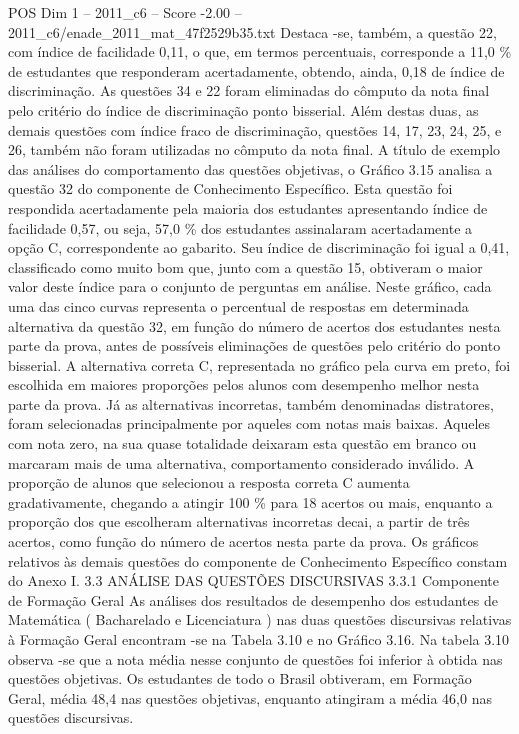 \begin{textsample}{POS Dim 1 – 2011\_c6 – Score -2.00 – 2011\_c6/enade\_2011\_mat\_47f2529b35.txt}
Destaca -se, também, a questão 22, com índice de facilidade 0,11, o que, em termos percentuais, corresponde a 11,0 \% de estudantes que responderam acertadamente, obtendo, ainda, 0,18 de índice de discriminação.
As questões 34 e 22 foram eliminadas do cômputo da nota final pelo critério do índice de discriminação ponto bisserial.
Além destas duas, as demais questões com índice fraco de discriminação, questões 14, 17, 23, 24, 25, e 26, também não foram utilizadas no cômputo da nota final.
A título de exemplo das análises do comportamento das questões objetivas, o Gráfico 3.15 analisa a questão 32 do componente de Conhecimento Específico.
Esta questão foi respondida acertadamente pela maioria dos estudantes apresentando índice de facilidade 0,57, ou seja, 57,0 \% dos estudantes assinalaram acertadamente a opção C, correspondente ao gabarito.
Seu índice de discriminação foi igual a 0,41, classificado como muito bom que, junto com a questão 15, obtiveram o maior valor deste índice para o conjunto de perguntas em análise.
Neste gráfico, cada uma das cinco curvas representa o percentual de respostas em determinada alternativa da questão 32, em função do número de acertos dos estudantes nesta parte da prova, antes de possíveis eliminações de questões pelo critério do ponto bisserial.
A alternativa correta C, representada no gráfico pela curva em preto, foi escolhida em maiores proporções pelos alunos com desempenho melhor nesta parte da prova.
Já as alternativas incorretas, também denominadas distratores, foram selecionadas principalmente por aqueles com notas mais baixas.
Aqueles com nota zero, na sua quase totalidade deixaram esta questão em branco ou marcaram mais de uma alternativa, comportamento considerado inválido.
A proporção de alunos que selecionou a resposta correta C aumenta gradativamente, chegando a atingir 100 \% para 18 acertos ou mais, enquanto a proporção dos que escolheram alternativas incorretas decai, a partir de três acertos, como função do número de acertos nesta parte da prova.
Os gráficos relativos às demais questões do componente de Conhecimento Específico constam do Anexo I. 3.3 ANÁLISE DAS QUESTÕES DISCURSIVAS 3.3.1 Componente de Formação Geral As análises dos resultados de desempenho dos estudantes de Matemática ( Bacharelado e Licenciatura ) nas duas questões discursivas relativas à Formação Geral encontram -se na Tabela 3.10 e no Gráfico 3.16.
Na tabela 3.10 observa -se que a nota média nesse conjunto de questões foi inferior à obtida nas questões objetivas.
Os estudantes de todo o Brasil obtiveram, em Formação Geral, média 48,4 nas questões objetivas, enquanto atingiram a média 46,0 nas questões discursivas.

\end{textsample}
